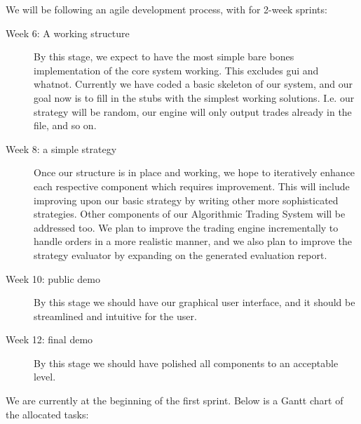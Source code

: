 \documentclass{article}
\begin{document}
We will be following an agile development process, with for 2-week sprints:
\begin{description}
  \item[Week 6: A working structure] By this stage, we expect to have the most simple bare bones implementation of the core system working. This excludes gui and whatnot. Currently we have coded a basic skeleton of our system, and our goal now is to fill in the stubs with the simplest working solutions. I.e. our strategy will be random, our engine will only output trades already in the file, and so on.
  \item[Week 8: a simple strategy] Once our structure is in place and working, we hope to iteratively enhance each respective component which requires improvement. This will include improving upon our basic strategy by writing other more sophisticated strategies. Other components of our Algorithmic Trading System will be addressed too. We plan to improve the trading engine incrementally to handle orders in a more realistic manner, and we also plan to improve the strategy evaluator by expanding on the generated evaluation report.
  \item[Week 10: public demo] By this stage we should have our graphical user interface, and it should be streamlined and intuitive for the user.
  \item[Week 12: final demo] By this stage we should have polished all components to an acceptable level.
\end{description}

We are currently at the beginning of the first sprint. Below is a Gantt chart of the allocated tasks:
\end{document}

